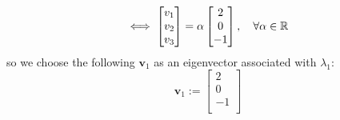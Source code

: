 \documentclass[12pt,a4paper]{article}
\begin{document}
\begin{itemize}
\begin{itemize}
\begin{equation}
      \iff
      \begin{bmatrix}
        v_{1} \\
        v_{2} \\
        v_{3} \\
      \end{bmatrix}
      =
      \alpha
      \begin{bmatrix}
        2 \\
        0 \\
        -1 \\
      \end{bmatrix},
      \quad \forall \alpha \in \mathbb{R}
    \end{equation}
    so we choose the following $\bm{v}_{1}$ as an eigenvector associated with $\lambda_{1}$:
    \begin{equation}\nonumber%
      \bm{v}_{1} := 
      \begin{bmatrix}
        2 \\
        0 \\
        -1 \\
      \end{bmatrix}
    \end{equation}


\end{itemize}
\end{itemize}
\end{document}
